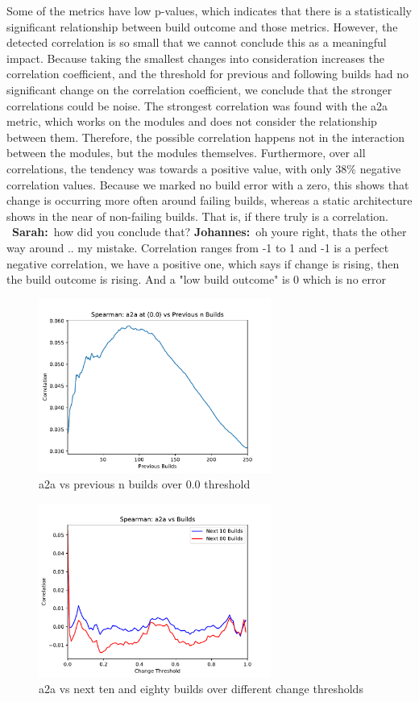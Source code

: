 \documentclass[sigplan, anonymous, review]{acmart}
\newcommand{\sn}[1]{{\color{blue}\textbf{Sarah:}~#1}}
\newcommand{\jk}[1]{{\color{violet}\textbf{Johannes:}~#1}}
\begin{document}
Some of the metrics have low p-values, which indicates that there is a statistically significant relationship between build outcome and those metrics. However, the detected correlation is so small that we cannot conclude this as a meaningful impact. Because taking the smallest changes into consideration increases the correlation coefficient, and the threshold for previous and following builds had no significant change on the correlation coefficient, we conclude that the stronger correlations could be noise. 
The strongest correlation was found with the a2a metric, which works on the modules and does not consider the relationship between them. Therefore, the possible correlation happens not in the interaction between the modules, but the modules themselves. Furthermore, over all correlations, the tendency was towards a positive value, with only $38\%$ negative correlation values. Because we marked no build error with a zero, this shows that change is occurring more often around failing builds, whereas a static architecture shows in the near of non-failing builds. That is, if there truly is a correlation.
~\sn{how did you conclude that?} \jk{oh youre right, thats the other way around .. my mistake. Correlation ranges from -1 to 1 and -1 is a perfect negative correlation, we have a positive one, which says if change is rising, then the build outcome is rising. And a "low build outcome" is 0 which is no error}

\begin{figure}[!t]
	\centering
	\includegraphics[width=3in]{assets/PrevN}
	\caption{a2a vs previous n builds over 0.0 threshold }
	\label{a2aPrevN}
\end{figure}

\begin{figure}[!t]
	\centering
	\includegraphics[width=3in]{assets/a2aCorr}
	\caption{a2a vs next ten and eighty builds over different change thresholds }
	\label{a2aPlot}
\end{figure}
\end{document}
